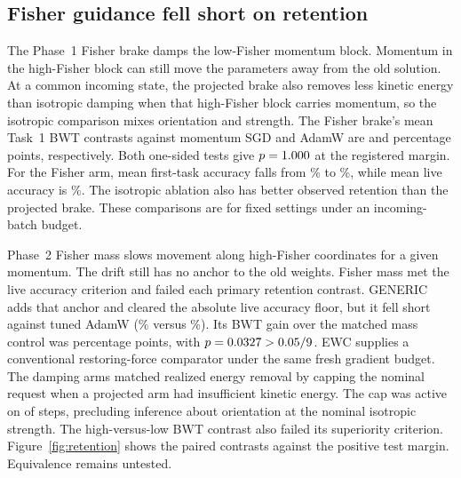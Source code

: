 \begin{table}[tbp]
  \centering\small
  \caption{Phase~2 recovery under the pre-specified policies and
  the post-hoc early-skip control. Clean alarm counts are reported
  separately for each policy over \PtwoSeeds{} clean windows per regime.
  The damage count uses dirty DKD-rewind windows that
  lost at least \PtwoDamageThreshold{} percentage points of Task~1
  accuracy at alarm relative to the true-origin state.
  The terminal-only baseline acts after the full speculative window.}
  \label{tab:recovery}
  
\end{table}

\subsection{Fisher guidance fell short on retention}

The Phase~1 Fisher brake damps the low-Fisher momentum block.
Momentum in the high-Fisher block can still move the parameters
away from the old solution. At a common incoming state, the
projected brake also removes less kinetic energy than isotropic
damping when that high-Fisher block carries momentum, so the
isotropic comparison mixes orientation and strength. The Fisher
brake's mean Task~1 BWT contrasts against
momentum SGD and AdamW are \PoneFisherSGDDelta{} and
\PoneFisherAdamDelta{} percentage points, respectively. Both
one-sided tests give \(p=1.000{}\) at the registered
margin. For the Fisher arm, mean first-task accuracy falls from
\PoneFisherStartPct{}\% to \PoneFisherEndPct{}\%, while mean live
accuracy is \PoneFisherLivePct{}\%. The isotropic ablation also
has better observed retention than the projected brake.
These comparisons are for fixed settings
under an incoming-batch budget.

Phase~2 Fisher mass slows movement along high-Fisher coordinates
for a given momentum. The drift still has no anchor to the old
weights. Fisher mass met the live accuracy criterion and failed
each primary retention contrast. GENERIC adds that anchor and
cleared the absolute live accuracy floor, but it fell short
against tuned AdamW (\PtwoGenericLivePct{}\% versus
\PtwoAdamLivePct{}\%). Its BWT gain over the matched mass control
was \PtwoGenericMassDelta{} percentage points, with
\(p=0.0327{}>0.05/9{}\). EWC supplies a conventional
restoring-force comparator under the same fresh gradient budget.
The damping arms matched realized energy removal by capping the
nominal request when a projected arm had insufficient kinetic
energy. The cap was active on \PtwoCaps{} of \PtwoEnergySteps{} steps,
precluding inference about orientation at the nominal isotropic
strength. The high-versus-low BWT contrast also failed its
superiority criterion. Figure~\ref{fig:retention} shows the paired
contrasts against the positive test margin. Equivalence remains
untested.

